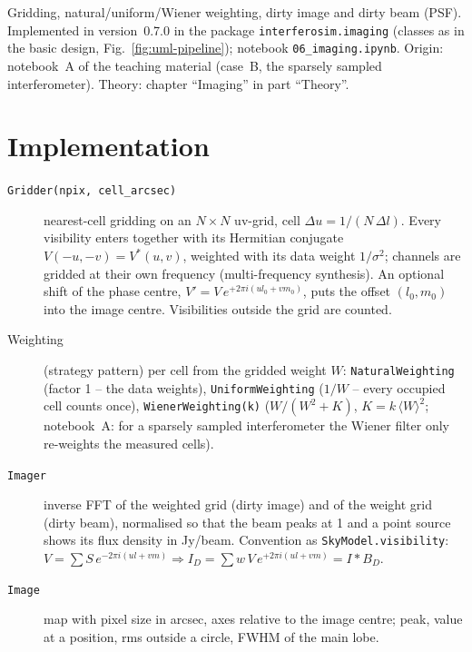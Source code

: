 \label{ch:imaging}

Gridding, natural/uniform/Wiener weighting, dirty image and dirty beam
(PSF). Implemented in version~0.7.0 in the package
\texttt{interferosim.imaging} (classes as in the basic design,
Fig.~\ref{fig:uml-pipeline}); notebook \texttt{06\_imaging.ipynb}. Origin:
notebook~A of the teaching material (case~B, the sparsely sampled
interferometer). Theory: chapter \enquote{Imaging} in part
\enquote{Theory}.

\section{Implementation}

\begin{description}
  \item[\texttt{Gridder(npix, cell\_arcsec)}] nearest-cell gridding on an
        $N\times N$ uv-grid, cell $\Delta u = 1/(N\,\Delta l)$. Every visibility
        enters together with its Hermitian conjugate
        $V(-u,-v) = V^*(u,v)$, weighted with its data weight $1/\sigma^2$;
        channels are gridded at their own frequency (multi-frequency
        synthesis). An optional shift of the phase centre,
        $V' = V\,e^{+2\pi i(ul_0+vm_0)}$, puts the offset $(l_0,m_0)$ into the
        image centre. Visibilities outside the grid are counted.
  \item[Weighting] (strategy pattern) per cell from the gridded weight
        $W$: \texttt{NaturalWeighting} (factor 1 -- the data weights),
        \texttt{UniformWeighting} ($1/W$ -- every occupied cell counts once),
        \texttt{WienerWeighting(k)} ($W/(W^2+K)$, $K = k\,\langle W\rangle^2$;
        notebook~A: for a sparsely sampled interferometer the Wiener filter
        only re-weights the measured cells).
  \item[\texttt{Imager}] inverse FFT of the weighted grid (dirty image) and
        of the weight grid (dirty beam), normalised so that the beam peaks
        at 1 and a point source shows its flux density in Jy/beam. Convention
        as \texttt{SkyModel.visibility}:
        $V = \sum S\,e^{-2\pi i(ul+vm)} \Rightarrow
         I_D = \sum w\,V\,e^{+2\pi i(ul+vm)} = I * B_D$.
  \item[\texttt{Image}] map with pixel size in arcsec, axes relative to the
        image centre; peak, value at a position, rms outside a circle, FWHM of
        the main lobe.
\end{description}

